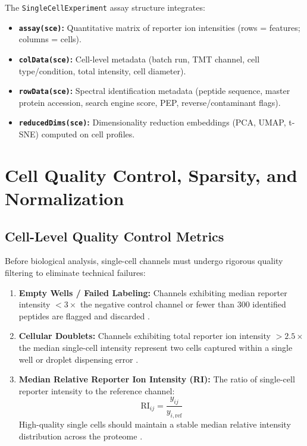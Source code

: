 \documentclass[11pt,twoside,openright]{book}
\begin{document}
The \texttt{SingleCellExperiment} assay structure integrates:
\begin{itemize}
    \item \textbf{\texttt{assay(sce)}:} Quantitative matrix of reporter ion intensities (rows = features; columns = cells).
    \item \textbf{\texttt{colData(sce)}:} Cell-level metadata (batch run, TMT channel, cell type/condition, total intensity, cell diameter).
    \item \textbf{\texttt{rowData(sce)}:} Spectral identification metadata (peptide sequence, master protein accession, search engine score, PEP, reverse/contaminant flags).
    \item \textbf{\texttt{reducedDims(sce)}:} Dimensionality reduction embeddings (PCA, UMAP, t-SNE) computed on cell profiles.
\end{itemize}

\section{Cell Quality Control, Sparsity, and Normalization}

\subsection{Cell-Level Quality Control Metrics}

Before biological analysis, single-cell channels must undergo rigorous quality filtering to eliminate technical failures:
\begin{enumerate}
    \item \textbf{Empty Wells / Failed Labeling:} Channels exhibiting median reporter intensity $< 3 \times$ the negative control channel or fewer than $300$ identified peptides are flagged and discarded \cite{vanderaa2021scp}.
    \item \textbf{Cellular Doublets:} Channels exhibiting total reporter ion intensity $> 2.5 \times$ the median single-cell intensity represent two cells captured within a single well or droplet dispensing error \cite{woo2022high}.
    \item \textbf{Median Relative Reporter Ion Intensity (RI):} The ratio of single-cell reporter intensity to the reference channel:
    \begin{equation}
    \text{RI}_{ij} = \frac{y_{ij}}{y_{i,\text{ref}}}
    \end{equation}
    High-quality single cells should maintain a stable median relative intensity distribution across the proteome \cite{specht2021single}.
\end{enumerate}
\end{document}
